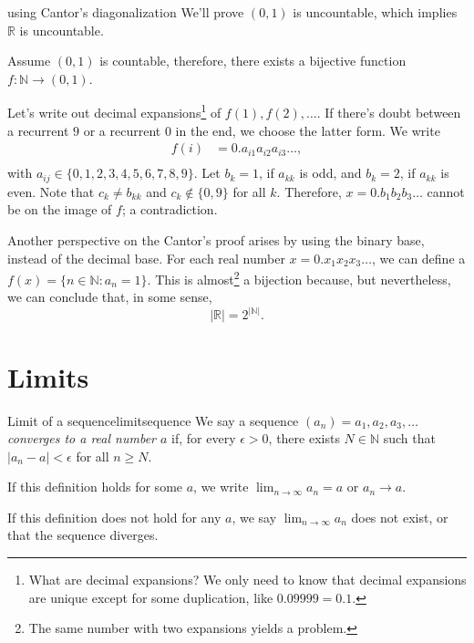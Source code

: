 
\begin{dem}{using Cantor's diagonalization}{}
	We'll prove \((0, 1)\) is uncountable, which implies \(\mathbb{R}\) is uncountable.

	Assume \((0, 1)\) is countable, therefore, there exists a bijective function \(f: \mathbb{N} \to (0, 1)\).

	Let's write out decimal expansions\footnote{What are decimal expansions? We only need to know that decimal expansions are unique except for some duplication, like \(0.09999 = 0.1\).} of \(f(1), f(2), \dots\). If there's doubt between a recurrent \(9\) or a recurrent \(0\) in the end, we choose the latter form. We write
	\begin{align*}
		f(i) &= 0.a_{i1}a_{i2}a_{i3}\dots,\\
	\end{align*}
	with \(a_{ij} \in \{0, 1, 2, 3, 4, 5, 6, 7, 8, 9\}\).
	Let \(b_k = 1\), if \(a_{kk}\) is odd, and \(b_k = 2\), if \(a_{kk}\) is even. Note that \(c_{k} \neq b_{kk}\) and \(c_{k} \notin \{0, 9\}\) for all \(k\).
	Therefore, \(x = 0.b_1b_2b_3\dots\) cannot be on the image of \(f\); a contradiction.
\end{dem}

Another perspective on the Cantor's proof arises by using the binary base, instead of the decimal base. For each real number \(x = 0.x_1x_2x_3\dots\), we can define a \(f(x) = \{n \in \mathbb{N} : a_n = 1\}\). This is almost\footnote{The same number with two expansions yields a problem.} a bijection because, but nevertheless, we can conclude that, in some sense, \[
		|\mathbb{R}| = 2^{|\mathbb{N}|}.
\]

\chapter{Limits}

\begin{defn}{Limit of a sequence}{limitsequence}
	We say a sequence \((a_n) = a_1, a_2, a_3, \dots\) \emph{converges to a real number \(a\)} if, for every \(\epsilon > 0\), there exists \(N \in \mathbb{N}\) such that \(|a_n - a| < \epsilon\) for all \(n \geq N\).

	If this definition holds for some \(a\), we write \(\lim_{n\to\infty} a_n = a\) or \(a_n \to a\).

	If this definition does not hold for any \(a\), we say \(\lim_{n\to\infty} a_n\) does not exist, or that the sequence diverges.
\end{defn}

